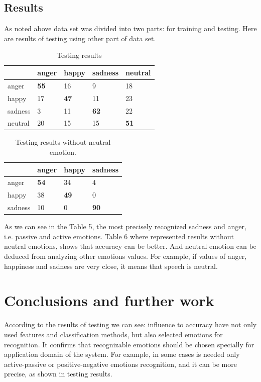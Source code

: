 \documentclass[14pt]{extarticle}
\begin{document}
\subsection{Results}
As noted above data set was divided into two parts: for training and testing. Here are results of testing using other part of data set.\\
\begin{table}[h]
	\centering
	\begin{tabular}{|l|l|l|l|l|}
		\hline
		&anger&happy&sadness&neutral\\ \hline
		anger&\textbf{55}&16&9&18\\\hline
		happy & 17 & \textbf{47} & 11 & 23 \\\hline
		sadness & 3 & 11 & \textbf{62} & 22\\\hline
		neutral & 20 & 15 & 15 & \textbf{51}\\\hline
		
	\end{tabular}
	\caption{Testing results}
\end{table}
\begin{table}[h]
	\centering
	\begin{tabular}{|l|l|l|l|}
		\hline
		&anger&happy&sadness\\ \hline
		anger&\textbf{54}&34&4\\\hline
		happy & 38 & \textbf{49} & 0\\\hline
		sadness & 10 & 0& \textbf{90}\\\hline
		
	\end{tabular}
	\caption{Testing results without neutral emotion.}
\end{table}
As we can see in the Table 5, the most precisely recognized sadness and anger, i.e. passive and active emotions. Table 6 where represented results without neutral emotions, shows that accuracy can be better. And neutral emotion can be deduced from analyzing other emotions values. For example, if values of anger, happiness and sadness are very close, it means that speech is neutral.


\section{Conclusions and further work}
According to the results of testing we can see: influence to accuracy have not only used features and classification methods, but also selected emotions for recognition. It confirms that recognizable emotions should be chosen specially for application domain of the system. For example, in some cases is needed only active-passive or positive-negative emotions recognition, and it can be more precise, as shown in testing results.
\end{document}
